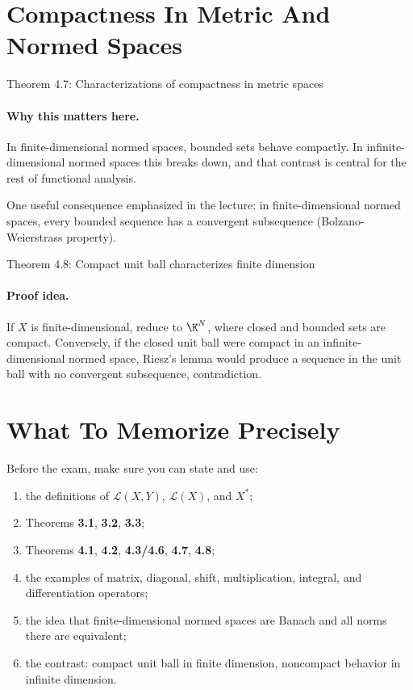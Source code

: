 \documentclass[11pt]{article}
\begin{document}
\section{Compactness In Metric And Normed Spaces}

\begin{thmbox}{Theorem 4.7: Characterizations of compactness in metric spaces}
\thmCompactEquivSequential
\end{thmbox}

\paragraph{Why this matters here.}
In finite-dimensional normed spaces, bounded sets behave compactly. In infinite-dimensional normed spaces this breaks down, and that contrast is central for the rest of functional analysis.

\begin{focusbox}
One useful consequence emphasized in the lecture: in finite-dimensional normed spaces, every bounded sequence has a convergent subsequence (Bolzano-Weierstrass property).
\end{focusbox}

\begin{thmbox}{Theorem 4.8: Compact unit ball characterizes finite dimension}
\thmUnitBallCompactIffFiniteDim
\end{thmbox}

\paragraph{Proof idea.}
If $X$ is finite-dimensional, reduce to $\K^N$, where closed and bounded sets are compact. Conversely, if the closed unit ball were compact in an infinite-dimensional normed space, Riesz's lemma would produce a sequence in the unit ball with no convergent subsequence, contradiction.

\section{What To Memorize Precisely}

\begin{focusbox}
Before the exam, make sure you can state and use:
\begin{enumerate}
\item the definitions of $\mathcal L(X,Y)$, $\mathcal L(X)$, and $X^*$;
\item Theorems \textbf{3.1}, \textbf{3.2}, \textbf{3.3};
\item Theorems \textbf{4.1}, \textbf{4.2}, \textbf{4.3/4.6}, \textbf{4.7}, \textbf{4.8};
\item the examples of matrix, diagonal, shift, multiplication, integral, and differentiation operators;
\item the idea that finite-dimensional normed spaces are Banach and all norms there are equivalent;
\item the contrast: compact unit ball in finite dimension, noncompact behavior in infinite dimension.
\end{enumerate}
\end{focusbox}
\end{document}
